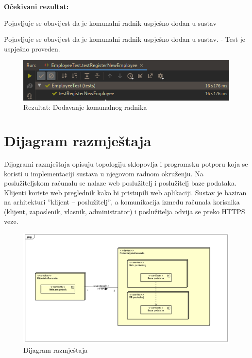 			\noindent \textbf{Očekivani rezultat:}
				\begin{packed_enum}
				\item Pojavljuje se obavijest da je komunalni radnik uspješno dodan u sustav
							
				
			\end{packed_enum}
			
		
			Pojavljuje se obavijest da je komunalni radnik uspješno dodan u sustav. - Test je uspješno proveden.

			\begin{figure}[H]
					\includegraphics[scale=0.57]{figures/admin-add-empl-pass.PNG}
					\centering
					\caption{Rezultat: Dodavanje komunalnog radnika}
					\label{fig:Dodavanje komunalnog radnika}
				\end{figure}


			
			\eject 
		
		
		\section{Dijagram razmještaja}
			
			Dijagrami razmještaja opisuju topologiju sklopovlja i programsku potporu koja se koristi u implementaciji sustava u njegovom radnom okruženju. Na poslužiteljskom računalu se nalaze web poslužitelj i poslužitelj baze podataka. Klijenti koriste web preglednik kako bi pristupili web aplikaciji. Sustav je baziran na arhitekturi ”klijent – poslužitelj”, a komunikacija između računala korisnika (klijent, zaposlenik, vlasnik, administrator) i poslužitelja odvija se preko HTTPS veze.
			
			\begin{figure}[H]
					\includegraphics[scale=0.4]{figures/Deployment Diagram0.PNG}
					\centering
					\caption{Dijagram razmještaja}
					\label{fig:Dijagram razmještaja}
				\end{figure}
			\eject 
		
